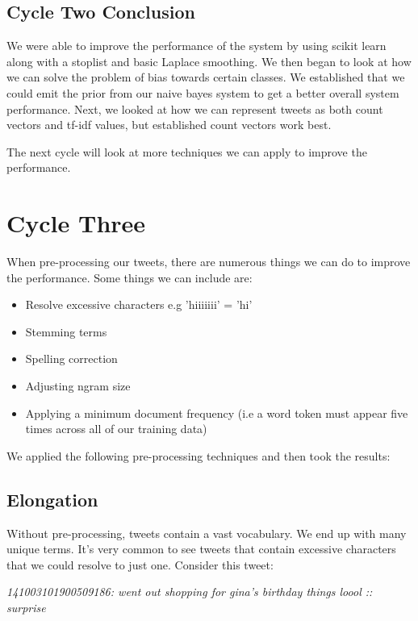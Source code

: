 \subsection{Cycle Two Conclusion}

We were able to improve the performance of the system by using scikit learn along with a stoplist and basic Laplace smoothing. We then began to look at how we can solve the problem of bias towards certain classes. We established that we could emit the prior from our naive bayes system to get a better overall system performance. Next, we looked at how we can represent tweets as both count vectors and tf-idf values, but established count vectors work best.

The next cycle will look at more techniques we can apply to improve the performance.

\section{Cycle Three} \label{cy3}

When pre-processing our tweets, there are numerous things we can do to improve the performance. Some things we can include are:
\begin{itemize}
    \item Resolve excessive characters e.g 'hiiiiiii' = 'hi'
    \item Stemming terms
    \item Spelling correction
    \item Adjusting ngram size
    \item Applying a minimum document frequency (i.e a word token must appear five times across all of our training data)
\end{itemize}
\bigskip

We applied the following pre-processing techniques and then took the results:

\subsection{Elongation} \label{Elong}

Without pre-processing, tweets contain a vast vocabulary. We end up with many unique terms. It's very common to see tweets that contain excessive characters that we could resolve to just one. Consider this tweet:

\begin{center}
\textit {141003101900509186:    went out shopping for gina's birthday things loool     :: surprise}
\end{center}

